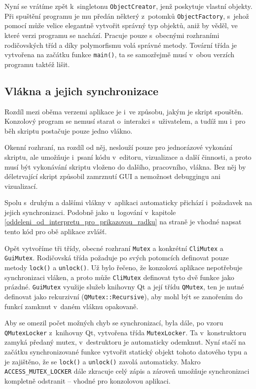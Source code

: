 \documentclass[11pt,twoside,a4paper]{book}
\begin{document}
Nyní se vrátíme zpět k~singletonu \texttt{ObjectCreator}, jenž poskytuje vlastní objekty. Při spuštění programu je mu předán některý z~potomků \texttt{ObjectFactory}, s~jehož pomocí může velice elegantně vytvořit správný typ objektů, aniž by věděl, ve které verzi programu se nachází. Pracuje pouze s~obecnými rozhraními rodičovských tříd a díky polymorfismu volá správné metody. Tovární třída je vytvořena na začátku funkce \texttt{main()}, ta se samozřejmě musí v~obou verzích programu taktéž lišit.


\subsection{Vlákna a jejich synchronizace}

Rozdíl mezi oběma verzemi aplikace je i~ve způsobu, jakým je skript spouštěn. Konzolový program se nemusí starat o~interakci s~uživatelem, a tudíž mu i~pro běh skriptu postačuje pouze jedno vlákno.

Okenní rozhraní, na rozdíl od něj, neslouží pouze pro jednorázové vykonání skriptu, ale umožňuje i~psaní kódu v~editoru, vizualizace a další činnosti, a proto musí být vykonávání skriptu vloženo do dalšího, pracovního, vlákna. Bez něj by déletrvající skript způsobil zamrznutí GUI a nemožnost debuggingu ani vizualizací.

Spolu s~druhým a dalšími vlákny v~aplikaci automaticky přichází i~požadavek na jejich synchronizaci. Podobně jako u~logování v~kapitole \ref{oddeleni_od_interpretu_pro_prikazovou_radku} na straně \pageref{oddeleni_od_interpretu_pro_prikazovou_radku} je vhodné napsat tento kód pro obě aplikace zvlášť.

Opět vytvoříme tři třídy, obecné rozhraní \texttt{Mutex} a konkrétní \texttt{CliMutex} a \texttt{GuiMutex}. Ro\-di\-čov\-ská třída požaduje po svých potomcích definovat pouze metody \texttt{lock()} a \texttt{unlock()}. Už bylo řečeno, že konzolová aplikace nepotřebuje synchronizaci vláken, a proto může \texttt{CliMutex} definovat tyto dvě funkce jako prázdné. \texttt{GuiMutex} využije služeb knihovny Qt a její třídu \texttt{QMutex}, ten je nutné definovat jako rekurzivní (\texttt{QMutex::Recursive}), aby mohl být se zanořením do funkcí zamknut v~daném vláknu opakovaně.

Aby se omezil počet možných chyb se synchronizací, byla dále, po vzoru \texttt{QMu\-tex\-Loc\-ker} z~knihovny Qt, vytvořena třída \texttt{MutexLocker}. Ta v~konstruktoru zamyká předaný mutex, v~destruktoru je automaticky odemknut. Nyní stačí na začátku synchronizované funkce vytvořit statický objekt tohoto datového typu a je zajištěno, že se \texttt{lock()} a \texttt{unlock()} zavolá automaticky. Makro \texttt{ACCESS\_MUTEX\_LOCKER} dále zkracuje celý zápis a zároveň umožňuje synchronizaci kompletně odstranit -- vhodné pro konzolovou aplikaci.
\end{document}
